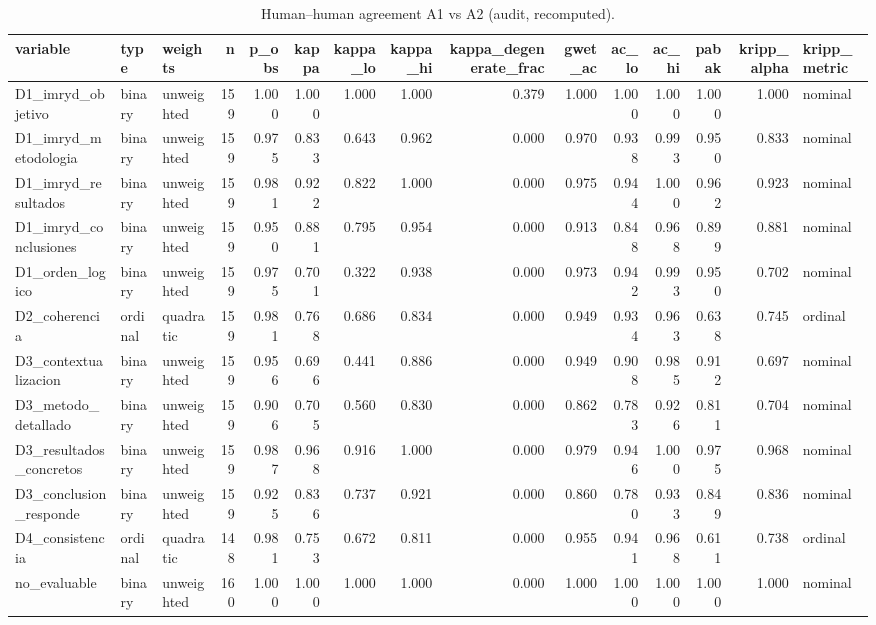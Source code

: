 \begin{table}
\caption{Human–human agreement A1 vs A2 (audit, recomputed).}
\label{tab:audit-hh}
\begin{tabular}{lllrrrrrrrrrrrl}
\toprule
variable & type & weights & n & p\_obs & kappa & kappa\_lo & kappa\_hi & kappa\_degenerate\_frac & gwet\_ac & ac\_lo & ac\_hi & pabak & kripp\_alpha & kripp\_metric \\
\midrule
D1\_imryd\_objetivo & binary & unweighted & 159 & 1.000 & 1.000 & 1.000 & 1.000 & 0.379 & 1.000 & 1.000 & 1.000 & 1.000 & 1.000 & nominal \\
D1\_imryd\_metodologia & binary & unweighted & 159 & 0.975 & 0.833 & 0.643 & 0.962 & 0.000 & 0.970 & 0.938 & 0.993 & 0.950 & 0.833 & nominal \\
D1\_imryd\_resultados & binary & unweighted & 159 & 0.981 & 0.922 & 0.822 & 1.000 & 0.000 & 0.975 & 0.944 & 1.000 & 0.962 & 0.923 & nominal \\
D1\_imryd\_conclusiones & binary & unweighted & 159 & 0.950 & 0.881 & 0.795 & 0.954 & 0.000 & 0.913 & 0.848 & 0.968 & 0.899 & 0.881 & nominal \\
D1\_orden\_logico & binary & unweighted & 159 & 0.975 & 0.701 & 0.322 & 0.938 & 0.000 & 0.973 & 0.942 & 0.993 & 0.950 & 0.702 & nominal \\
D2\_coherencia & ordinal & quadratic & 159 & 0.981 & 0.768 & 0.686 & 0.834 & 0.000 & 0.949 & 0.934 & 0.963 & 0.638 & 0.745 & ordinal \\
D3\_contextualizacion & binary & unweighted & 159 & 0.956 & 0.696 & 0.441 & 0.886 & 0.000 & 0.949 & 0.908 & 0.985 & 0.912 & 0.697 & nominal \\
D3\_metodo\_detallado & binary & unweighted & 159 & 0.906 & 0.705 & 0.560 & 0.830 & 0.000 & 0.862 & 0.783 & 0.926 & 0.811 & 0.704 & nominal \\
D3\_resultados\_concretos & binary & unweighted & 159 & 0.987 & 0.968 & 0.916 & 1.000 & 0.000 & 0.979 & 0.946 & 1.000 & 0.975 & 0.968 & nominal \\
D3\_conclusion\_responde & binary & unweighted & 159 & 0.925 & 0.836 & 0.737 & 0.921 & 0.000 & 0.860 & 0.780 & 0.933 & 0.849 & 0.836 & nominal \\
D4\_consistencia & ordinal & quadratic & 148 & 0.981 & 0.753 & 0.672 & 0.811 & 0.000 & 0.955 & 0.941 & 0.968 & 0.611 & 0.738 & ordinal \\
no\_evaluable & binary & unweighted & 160 & 1.000 & 1.000 & 1.000 & 1.000 & 0.000 & 1.000 & 1.000 & 1.000 & 1.000 & 1.000 & nominal \\
\bottomrule
\end{tabular}
\end{table}
